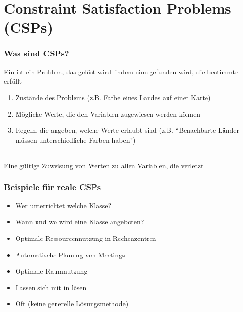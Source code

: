 \section{Constraint Satisfaction Problems (CSPs)}
\subsubsection*{Was sind CSPs?}
Ein  ist ein Problem, das gelöst wird, indem eine  gefunden wird, die bestimmte  erfüllt\\
\begin{enumerate}
    \item {} Zustände des Problems (z.B. Farbe eines Landes auf einer Karte)
    \item {} Mögliche Werte, die den Variablen zugewiesen werden können
    \item {} Regeln, die angeben, welche Werte erlaubt sind (z.B. \enquote{Benachbarte Länder müssen unterschiedliche Farben haben})
\end{enumerate}
\\
Eine gültige Zuweisung von Werten zu allen Variablen, die  verletzt
\subsubsection*{Beispiele für reale CSPs}
\begin{itemize}
    \item {} Wer unterrichtet welche Klasse?
    \item {} Wann und wo wird eine Klasse angeboten?
    \item {} Optimale Ressourcennutzung in Rechenzentren
    \item {} Automatische Planung von Meetings
    \item {} Optimale Raumnutzung
\end{itemize}
\begin{itemize}
    \item {} Lassen sich mit  in  lösen
    \item {} Oft  (keine generelle Lösungsmethode)
\end{itemize}
